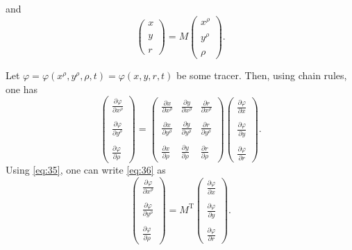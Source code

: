 \documentclass[12pt]{report}
\def\p{\partial}
\begin{document}
and
\begin{equation}
\label{eq:35}
  \left(\begin{matrix} x\\ \\ y\\ \\ r\end{matrix}\right) =
  M\left(\begin{matrix}x^\rho \\
      \\ y^\rho \\ \\ \rho\end{matrix}\right).
\end{equation}

Let $\varphi = \varphi(x^\rho, y^\rho, \rho,t) = \varphi(x,y,r,t)$ be
some tracer. Then, using chain rules, one has
\begin{equation}
\label{eq:36}
  \left(\begin{matrix}\frac{\p\varphi}{\p x^\rho}\\ \\
      \frac{\p\varphi}{\p y^\rho} \\ \\ \frac{\p\varphi}{\p
        \rho} \end{matrix}\right)= 
  \left(\begin{matrix}\frac{\p x}{\p x^\rho} & \frac{\p y}{\p x^\rho} &
      \frac{\p r}{\p x^\rho} \\ \\
\frac{\p x}{\p y^\rho} & \frac{\p y}{\p y^\rho} &
     \frac{\p r}{\p y^\rho} \\ \\
\frac{\p x}{\p \rho} & \frac{\p y}{\p\rho} &
    \frac{\p r}{\p\rho} 
\end{matrix}\right)  
  \left(\begin{matrix}\frac{\p\varphi}{\p x}\\ \\
      \frac{\p\varphi}{\p y} \\ \\ \frac{\p\varphi}{\p
        r} \end{matrix}\right).
\end{equation}
Using \eqref{eq:35}, one can write \eqref{eq:36} as
\begin{equation}
\label{eq:37}
  \left(\begin{matrix}\frac{\p\varphi}{\p x^\rho}\\ \\
      \frac{\p\varphi}{\p y^\rho} \\ \\ \frac{\p\varphi}{\p
        \rho} \end{matrix}\right)= 
  M^\textrm{T}
  \left(\begin{matrix}\frac{\p\varphi}{\p x}\\ \\
      \frac{\p\varphi}{\p y} \\ \\ \frac{\p\varphi}{\p
        r} \end{matrix}\right).
\end{equation}
\end{document}
